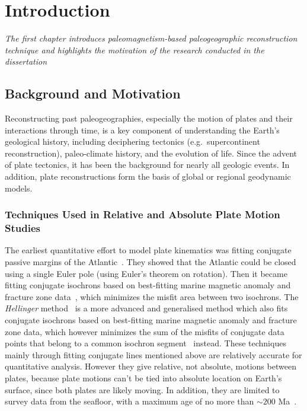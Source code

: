 \chapter{Introduction}\label{chap:Intro}
\textit{The first chapter introduces paleomagnetism-based paleogeographic
reconstruction technique and highlights the motivation of the research conducted
in the dissertation}
\vfill
\minitoc\newpage

\section{Background and Motivation}

Reconstructing past paleogeographies, especially the motion of plates and their
interactions through time, is a key component of understanding the Earth's
geological history, including deciphering tectonics (e.g.\ supercontinent
reconstruction), paleo-climate history, and the evolution of life. Since the
advent of plate tectonics, it has been the background for nearly all geologic
events. In addition, plate reconstructions form the basis of global or regional
geodynamic models.

\subsection{Techniques Used in Relative and Absolute Plate Motion Studies}

The earliest quantitative effort to model plate kinematics was fitting conjugate
passive margins of the Atlantic~\citep{B65,W07}. They showed that the Atlantic
could be closed using a single Euler pole (using Euler's theorem on rotation).
Then it became fitting conjugate isochrons based on best-fitting marine magnetic
anomaly and fracture zone data~\citep{M71}, which minimizes the misfit area
between two isochrons. The \emph{Hellinger} method~\citep{H81} is a more advanced
and generalised method which also fits conjugate isochrons based on best-fitting
marine magnetic anomaly and fracture zone data, which however minimizes the sum
of the misfits of conjugate data points that belong to a common isochron
segment~\citep{W07} instead. These techniques mainly through fitting conjugate
lines mentioned above are relatively accurate for quantitative analysis. However
they give relative, not absolute, motions between plates, because plate motions
can't be tied into absolute location on Earth's surface, since both plates are
likely moving. In addition, they are limited to survey data from the seafloor,
with a maximum age of no more than ${\sim}200$ Ma~\citep{M08}.

